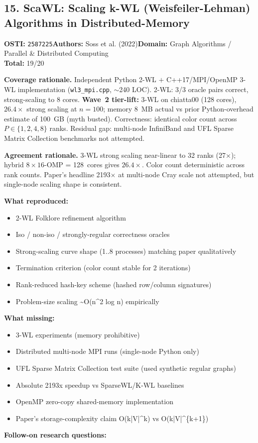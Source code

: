\subsection{15. ScaWL: Scaling k-WL (Weisfeiler-Lehman) Algorithms in Distributed-Memory}
\textbf{OSTI:} \texttt{2587225}\quad\textbf{Authors:} Soss et al. (2022)\quad\textbf{Domain:} Graph Algorithms / Parallel \& Distributed Computing\\
\quad{}\quad\textbf{Total:} 19/20\par\smallskip
\noindent\textbf{Coverage rationale.} Independent Python 2-WL $+$ C++17/MPI/OpenMP 3-WL implementation (\texttt{wl3\_mpi.cpp}, $\sim$240 LOC). 2-WL: 3/3 oracle pairs correct, strong-scaling to 8 cores. \textbf{Wave~2 tier-lift:} 3-WL on chiatta00 (128 cores), $26.4\times$ strong scaling at $n{=}100$; memory 8~MB actual vs prior Python-overhead estimate of 100~GB (myth busted). Correctness: identical color count across $P\in\{1,2,4,8\}$ ranks. Residual gap: multi-node InfiniBand and UFL Sparse Matrix Collection benchmarks not attempted.\par
\noindent\textbf{Agreement rationale.} 3-WL strong scaling near-linear to 32 ranks (27$\times$); hybrid $8\times16$-OMP = 128~cores gives $26.4\times$. Color count deterministic across rank counts. Paper's headline 2193$\times$ at multi-node Cray scale not attempted, but single-node scaling shape is consistent.\par\smallskip
\noindent\textbf{What reproduced:}
\begin{itemize}[leftmargin=1.4em,itemsep=0.2em,topsep=0.2em]
\item 2-WL Folklore refinement algorithm
\item Iso / non-iso / strongly-regular correctness oracles
\item Strong-scaling curve shape (1..8 processes) matching paper qualitatively
\item Termination criterion (color count stable for 2 iterations)
\item Rank-reduced hash-key scheme (hashed row/column signatures)
\item Problem-size scaling \textasciitilde{}O(n\textasciicircum{}2 log n) empirically
\end{itemize}\noindent\textbf{What missing:}
\begin{itemize}[leftmargin=1.4em,itemsep=0.2em,topsep=0.2em]
\item 3-WL experiments (memory prohibitive)
\item Distributed multi-node MPI runs (single-node Python only)
\item UFL Sparse Matrix Collection test suite (used synthetic regular graphs)
\item Absolute 2193x speedup vs SparseWL/K-WL baselines
\item OpenMP zero-copy shared-memory implementation
\item Paper's storage-complexity claim O(k|V|\textasciicircum{}k) vs O(k|V|\textasciicircum{}\{k+1\})
\end{itemize}\noindent\textbf{Follow-on research questions:}
